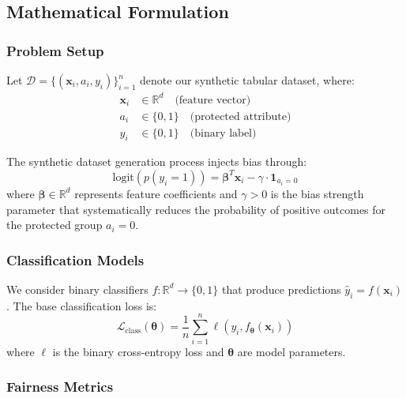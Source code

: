 \subsection{Mathematical Formulation}

\subsubsection{Problem Setup}

Let $\mathcal{D} = \{(\mathbf{x}_i, a_i, y_i)\}_{i=1}^n$ denote our synthetic tabular dataset, where:
\begin{align}
\mathbf{x}_i &\in \mathbb{R}^d \quad \text{(feature vector)} \label{eq:features}\\
a_i &\in \{0, 1\} \quad \text{(protected attribute)} \label{eq:protected}\\
y_i &\in \{0, 1\} \quad \text{(binary label)} \label{eq:labels}
\end{align}

The synthetic dataset generation process injects bias through:
\begin{equation}
\text{logit}(p(y_i = 1)) = \boldsymbol{\beta}^T \mathbf{x}_i - \gamma \cdot \mathbf{1}_{a_i = 0} \label{eq:bias_injection}
\end{equation}
where $\boldsymbol{\beta} \in \mathbb{R}^d$ represents feature coefficients and $\gamma > 0$ is the bias strength parameter that systematically reduces the probability of positive outcomes for the protected group $a_i = 0$.

\subsubsection{Classification Models}

We consider binary classifiers $f: \mathbb{R}^d \rightarrow \{0, 1\}$ that produce predictions $\hat{y}_i = f(\mathbf{x}_i)$. The base classification loss is:
\begin{equation}
\mathcal{L}_{\text{class}}(\boldsymbol{\theta}) = \frac{1}{n} \sum_{i=1}^n \ell(y_i, f_{\boldsymbol{\theta}}(\mathbf{x}_i)) \label{eq:class_loss}
\end{equation}
where $\ell$ is the binary cross-entropy loss and $\boldsymbol{\theta}$ are model parameters.

\subsubsection{Fairness Metrics}

